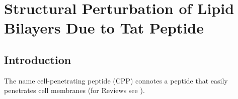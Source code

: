 \chapter{Structural Perturbation of Lipid Bilayers Due to Tat Peptide}
%
%

\section{Introduction}\label{sec:Tat_intro}
The name cell-penetrating peptide (CPP) connotes a peptide that 
easily penetrates cell membranes (for Reviews see \cite{Fischer05,Joliot04,Lindgren00}). 

